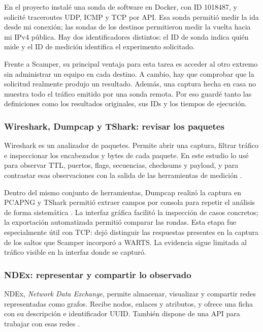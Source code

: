 En el proyecto instalé una sonda de software en Docker, con ID 1018487, y solicité traceroutes UDP, ICMP y TCP por API. Esa sonda permitió medir la ida desde mi conexión; las sondas de los destinos permitieron medir la vuelta hacia mi IPv4 pública. Hay dos identificadores distintos: el ID de sonda indica quién mide y el ID de medición identifica el experimento solicitado.

Frente a Scamper, su principal ventaja para esta tarea es acceder al otro extremo sin administrar un equipo en cada destino. A cambio, hay que comprobar que la solicitud realmente produjo un resultado. Además, una captura hecha en casa no muestra todo el tráfico emitido por una sonda remota. Por eso guardé tanto las definiciones como los resultados originales, sus IDs y los tiempos de ejecución.

\subsubsection{Wireshark, Dumpcap y TShark: revisar los paquetes}

Wireshark es un analizador de paquetes. Permite abrir una captura, filtrar tráfico e inspeccionar los encabezados y bytes de cada paquete. En este estudio lo usé para observar TTL, puertos, flags, secuencias, checksums y payload, y para contrastar esas observaciones con la salida de las herramientas de medición \cite{plat_wireshark}.

Dentro del mismo conjunto de herramientas, Dumpcap realizó la captura en PCAPNG y TShark permitió extraer campos por consola para repetir el análisis de forma sistemática \cite{plat_dumpcap,ref2}. La interfaz gráfica facilitó la inspección de casos concretos; la exportación automatizada permitió comparar las rondas. Esta etapa fue especialmente útil con TCP: dejó distinguir las respuestas presentes en la captura de los saltos que Scamper incorporó a WARTS. La evidencia sigue limitada al tráfico visible en la interfaz donde se capturó.

\subsubsection{NDEx: representar y compartir lo observado}

NDEx, \emph{Network Data Exchange}, permite almacenar, visualizar y compartir redes representadas como grafos. Recibe nodos, enlaces y atributos, y ofrece una ficha con su descripción e identificador UUID. También dispone de una API para trabajar con esas redes \cite{ref5,plat_ndex}.

